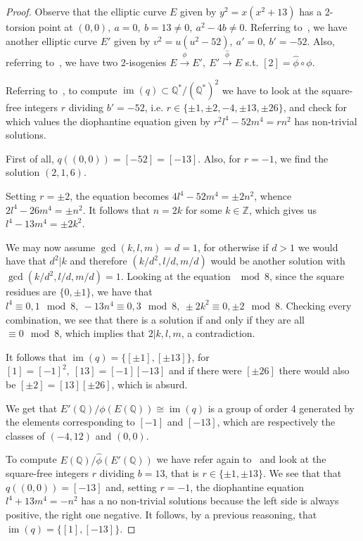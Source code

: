 \documentclass{article}
\newcommand{\numberset}{\mathbb}
\newcommand{\Z}{\numberset{Z}}
\newcommand{\Q}{\numberset{Q}}
\DeclareMathOperator{\im}{im}
\begin{document}
\begin{proof}
    Observe that the elliptic curve $E$ given by $y^2=x(x^2+13)$ has a 2-torsion
    point at $(0,0),\ a=0,\ b=13\neq 0,\ a^2-4b\neq0$. Referring
    to~\cite[lemma 4]{Bri18}, we have another elliptic curve $E'$ given by
    $v^2=u(u^2-52),\ a'=0,\ b'=-52$. Also, referring to~\cite[lemma 4,5]{Bri18},
    we have two 2-isogenies $E\xrightarrow{\phi}E',\ 
    E'\xrightarrow{\hat{\phi}}E$ s.t. $[2]=\hat{\phi}\circ\phi$.

    Referring to~\cite[lemma 6,7]{Bri18}, to compute
    $\im(q)\subset\Q^*/(\Q^*)^2$ we have to look at the square-free integers $r$
    dividing $b'=-52$, i.e. $r\in\{\pm 1,\pm 2,-4,\pm 13,\pm 26\}$, and check
    for which values the diophantine equation given by $r^2l^4-52m^4=rn^2$ has
    non-trivial solutions.

    First of all, $q((0,0))=[-52]=[-13]$. Also, for $r=-1$, we find the solution
    $(2,1,6)$.
    
    Setting $r=\pm2$, the equation becomes $4l^4-52m^4=\pm2n^2$, whence
    $2l^4-26m^4=\pm n^2$. It follows that $n=2k$ for some $k\in\Z$, which gives
    us $l^4-13m^4=\pm 2k^2$.

    We may now assume $\gcd(k,l,m)=d=1$, for otherwise if $d>1$ we would have
    that $d^2|k$ and therefore $(k/d^2,l/d,m/d)$ would be another solution with
    $\gcd(k/d^2,l/d,m/d)=1$.
    Looking at the equation $\mod 8$, since the square residues are
    $\{0,\pm1\}$, we have that $l^4\equiv 0,1\mod 8,\ -13n^4\equiv 0,3\mod 8,\
    \pm2k^2\equiv 0,\pm 2\mod 8$. Checking every combination, we see that there
    is a solution if and only if they are all $\equiv 0\mod 8$, which implies
    that $2|k,l,m$, a contradiction.

    It follows that $\im(q)=\{[\pm 1],[\pm 13]\}$, for $[1]=[-1]^2,\
    [13]=[-1][-13]$ and if there were $[\pm 26]$ there would also be $[\pm
    2]=[13][\pm 26]$, which is absurd.

    We get that $E'(\Q)/\phi(E(\Q))\cong\im(q)$ is a group of order 4 generated
    by the elements corresponding to $[-1]$ and $[-13]$, which are respectively
    the classes of $(-4,12)$ and $(0,0)$.

    To compute $E(\Q)/\hat{\phi}(E'(\Q))$ we have refer again to~\cite[lemma
    6,7]{Bri18} and look at the square-free integers $r$ dividing $b=13$, that
    is $r\in\{\pm1,\pm13\}$. We see that that $q((0,0))=[-13]$ and, setting
    $r=-1$, the diophantine equation $l^4+13m^4=-n^2$ has a no non-trivial
    solutions because the left side is always positive, the right one negative.
    It follows, by a previous reasoning, that $\im(q)=\{[1],[-13]\}$.


\end{proof}
\end{document}
